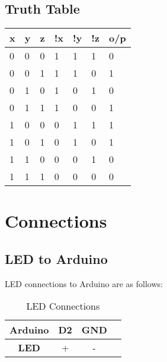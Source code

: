\documentclass[a4paper,11pt]{article}
\newcommand\HSPC{\rule{0pt}{4ex}\rule[-2.0ex]{0pt}{0pt}}
\begin{document}
\subsection{Truth Table}
\label{sec:ttf}
\begin{table}[!h]
        \centering
        
\begin{tabular}{|p{}|p{}|p{}|p{}|p{}|p{}|p{}|}
\hline 
 x & y & z & !x & !y & !z & o/p \\
\hline 
 0 & 0 & 0 & 1 & 1 & 1 & 0 \\
\hline 
 0 & 0 & 1 & 1 & 1 & 0 & 1 \\
\hline 
 0 & 1 & 0 & 1 & 0 & 1 & 0 \\
\hline 
 0 & 1 & 1 & 1 & 0 & 0 & 1 \\
\hline 
 1 & 0 & 0 & 0 & 1 & 1 & 1 \\
\hline 
 1 & 0 & 1 & 0 & 1 & 0 & 1 \\
\hline 
 1 & 1 & 0 & 0 & 0 & 1 & 0 \\
\hline 
 1 & 1 & 1 & 0 & 0 & 0 & 0 \\
 \hline
\end{tabular}
        
        \end{table}
\newpage
\section{Connections}
    \subsection{LED to Arduino}
        LED connections to Arduino are as follows:
        \begin{table}[ht]
            \centering
            \begin{tabular}{|c |c |c |c |}
            \hline
                \textbf{Arduino} & D2 & GND \HSPC \\
            \hline
                \textbf{LED} & + & - \HSPC \\ 
            \hline
            \end{tabular}
            \caption{LED Connections}
            \label{tab:cnct_led}
        \end{table}
        
\end{document}
